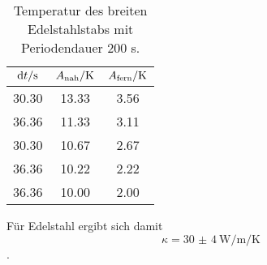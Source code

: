 \begin{table}

	\centering

	\caption{Temperatur des breiten Edelstahlstabs mit Periodendauer 200 s.}


	\begin{tabular}{S[table-format=3.2] S[table-format=3.2]S[table-format=3.2]}

		\toprule

		{$\mathrm{d}t/\si[per-mode=reciprocal]{\second}$}&{$A_\text{nah}/\si[per-mode=reciprocal]{\kelvin}$}&{$A_\text{fern}/\si[per-mode=reciprocal]{\kelvin}$} \\

		\midrule

		30.30 & 13.33 & 3.56 \\

		36.36 & 11.33 & 3.11 \\

		30.30 & 10.67 & 2.67 \\

		36.36 & 10.22 & 2.22 \\

		36.36 & 10.00 & 2.00 \\

		\bottomrule

	\end{tabular}

	\label{tab:tab4}

\end{table}

Für Edelstahl ergibt sich damit \[\kappa = \SI{30(4)}{\watt\per\metre\per\kelvin}\].